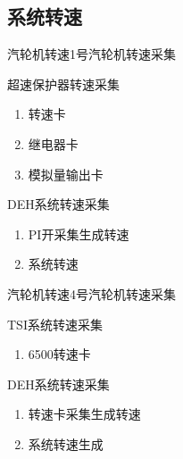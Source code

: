 \documentclass[12pt,hyperref={CJKbookmarks=true}]{beamer} %
\begin{document}
\subsection{系统转速}
\begin{frame}{汽轮机转速}{1号汽轮机转速采集}
\begin{block}{超速保护器转速采集}
			\begin{enumerate}
				\item 转速卡
				\item 继电器卡
				\item 模拟量输出卡
			\end{enumerate}
		\end{block}
\begin{block}{DEH系统转速采集}
			\begin{enumerate}
				\item PI开采集生成转速
				\item 系统转速
			\end{enumerate}
		\end{block}

\end{frame}
\begin{frame}{汽轮机转速}{4号汽轮机转速采集}
\begin{block}{TSI系统转速采集}
			\begin{enumerate}
				\item 6500转速卡
			\end{enumerate}
		\end{block}
\begin{block}{DEH系统转速采集}
			\begin{enumerate}
				\item 转速卡采集生成转速
				\item 系统转速生成
			\end{enumerate}
		\end{block}

\end{frame}
\end{document}
